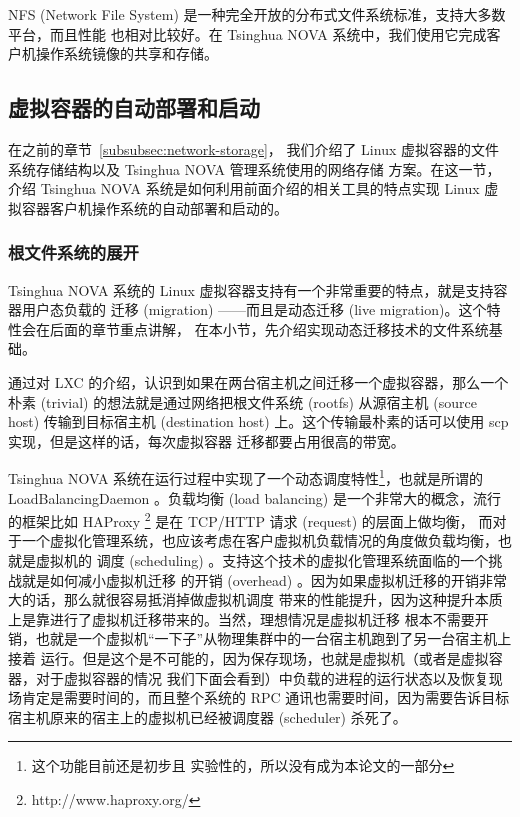 NFS (Network File System) 是一种完全开放的分布式文件系统标准，支持大多数平台，而且性能
也相对比较好。在 Tsinghua NOVA 系统中，我们使用它完成客户机操作系统镜像的共享和存储。

\subsection{虚拟容器的自动部署和启动}

在之前的章节~\ref{subsubsec:network-storage}，
我们介绍了 Linux 虚拟容器的文件系统存储结构以及 Tsinghua NOVA 管理系统使用的网络存储
方案。在这一节，介绍 Tsinghua NOVA 系统是如何利用前面介绍的相关工具的特点实现 Linux
虚拟容器客户机操作系统的自动部署和启动的。

\subsubsection{根文件系统的展开}
\label{subsubsec:deployment-rootfs}

Tsinghua NOVA 系统的 Linux 虚拟容器支持有一个非常重要的特点，就是支持容器用户态负载的
迁移 (migration) ——而且是动态迁移 (live migration)。这个特性会在后面的章节重点讲解，
在本小节，先介绍实现动态迁移技术的文件系统基础。

通过对 LXC 的介绍，认识到如果在两台宿主机之间迁移一个虚拟容器，那么一个朴素 (trivial)
的想法就是通过网络把根文件系统 (rootfs) 从源宿主机 (source host) 传输到目标宿主机
(destination host) 上。这个传输最朴素的话可以使用 scp 实现，但是这样的话，每次虚拟容器
迁移都要占用很高的带宽。

Tsinghua NOVA 系统在运行过程中实现了一个动态调度特性\footnote{这个功能目前还是初步且
实验性的，所以没有成为本论文的一部分}，也就是所谓的 LoadBalancingDaemon 。负载均衡
(load balancing) 是一个非常大的概念，流行的框架比如 HAProxy
\footnote{http://www.haproxy.org/} 是在 TCP/HTTP 请求 (request) 的层面上做均衡，
而对于一个虚拟化管理系统，也应该考虑在客户虚拟机负载情况的角度做负载均衡，也就是虚拟机的
调度 (scheduling) 。支持这个技术的虚拟化管理系统面临的一个挑战就是如何减小虚拟机迁移
的开销 (overhead) 。因为如果虚拟机迁移的开销非常大的话，那么就很容易抵消掉做虚拟机调度
带来的性能提升，因为这种提升本质上是靠进行了虚拟机迁移带来的。当然，理想情况是虚拟机迁移
根本不需要开销，也就是一个虚拟机“一下子”从物理集群中的一台宿主机跑到了另一台宿主机上接着
运行。但是这个是不可能的，因为保存现场，也就是虚拟机（或者是虚拟容器，对于虚拟容器的情况
我们下面会看到）中负载的进程的运行状态以及恢复现场肯定是需要时间的，而且整个系统的 RPC
通讯也需要时间，因为需要告诉目标宿主机原来的宿主上的虚拟机已经被调度器 (scheduler) 杀死了。

